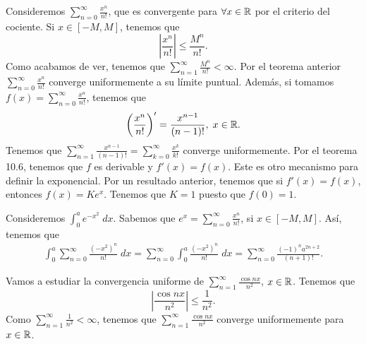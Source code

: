 \begin{eg}
	\normalfont Consideremos $\displaystyle \sum^{\infty}_{n = 0}\frac{x^{n}}{n!} $, que es convergente para $\displaystyle \forall x \in \mathbb{R} $ por el criterio del cociente. Si $\displaystyle x \in \left[-M,M\right]  $, tenemos que 
	\[ \left|\frac{x^{n}}{n!}\right| \leq \frac{M^{n}}{n!} .\]
	Como acabamos de ver, tenemos que $\displaystyle \sum^{\infty}_{n = 1}\frac{M^{n}}{n!} < \infty $. Por el teorema anterior $\displaystyle \sum^{\infty}_{n = 0}\frac{x^{n}}{n!} $ converge uniformemente a su límite puntual. Además, si tomamos $\displaystyle f\left(x\right) = \sum^{\infty}_{n = 0}\frac{x^{n}}{n!} $, tenemos que 
	\[ \left(\frac{x^{n}}{n!}\right)' = \frac{x^{n-1}}{\left(n-1\right)!}, \; x \in \mathbb{R} .\]
	Tenemos que $\displaystyle \sum^{\infty}_{n = 1}\frac{x^{n-1}}{\left(n-1\right)!} = \sum^{\infty}_{k = 0}\frac{x^{k}}{k!} $ converge uniformemente. Por el teorema 10.6, tenemos que $\displaystyle f $ es derivable y $\displaystyle f'\left(x\right) = f\left(x\right) $. Este es otro mecanismo para definir la exponencial. Por un resultado anterior, tenemos que si $\displaystyle f'\left(x\right) = f\left(x\right) $, entonces $\displaystyle f\left(x\right) = Ke^{x} $. Tenemos que $\displaystyle K = 1 $ puesto que $\displaystyle f\left(0\right) = 1 $.
\end{eg}
\begin{eg}
	\normalfont Consideremos $\displaystyle \int^{a}_{0} e^{-x^{2}} \; dx $. Sabemos que $\displaystyle e^{x} = \sum^{\infty}_{n = 0}\frac{x^{n}}{n!} $, si $\displaystyle x \in \left[-M,M\right]  $. Así, tenemos que 
	\[
	\begin{split}
	\int^{a}_{0} \sum^{\infty}_{n = 0}\frac{\left(-x^{2}\right)^{n}}{n!} \; dx = \sum^{\infty}_{n = 0}\int^{a}_{0} \frac{\left(-x^{2}\right)^{n}}{n!} \; dx = \sum^{\infty}_{n= 0}\frac{\left(-1\right)^{n}a^{2n+2}}{\left(n+1\right)!} .
	\end{split}
	\]
\end{eg}
\begin{eg}
\normalfont Vamos a estudiar la convergencia uniforme de $\displaystyle \sum^{\infty}_{n = 1}\frac{\cos nx}{n^{2}} $, $\displaystyle x \in \mathbb{R} $. Tenemos que
\[ \left|\frac{\cos nx }{n^{2}}\right| \leq \frac{1}{n^{2}}.\]
Como $\displaystyle \sum^{\infty}_{n = 1}\frac{1}{n^{2}} < \infty $, tenemos que $\displaystyle \sum^{\infty}_{n = 1}\frac{\cos n x}{n^{2}} $ converge uniformemente para $\displaystyle x\in \mathbb{R} $.
\end{eg}
